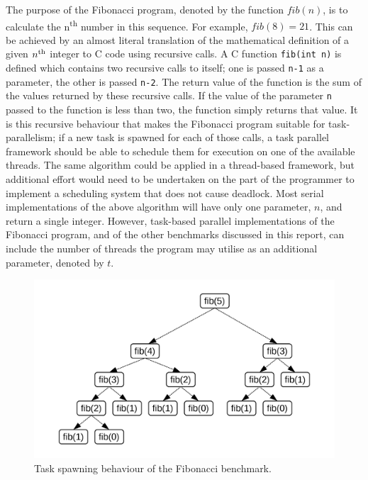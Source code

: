 \documentclass{report}
\begin{document}
The purpose of the Fibonacci program, denoted by the function \(fib(n)\), is to calculate the n\textsuperscript{th} number in this sequence. For example, \(fib(8) = 21\). This can be achieved by an almost literal translation of the mathematical definition of a given \(n\textsuperscript{th}\) integer to C code using recursive calls. A C function \verb!fib(int n)! is defined which contains two recursive calls to itself; one is passed \verb!n-1! as a parameter, the other is passed \verb!n-2!. The return value of the function is the sum of the values returned by these recursive calls. If the value of the parameter \verb!n! passed to the function is less than two, the function simply returns that value. It is this recursive behaviour that makes the Fibonacci program suitable for task-parallelism; if a new task is spawned for each of those calls, a task parallel framework should be able to schedule them for execution on one of the available threads. The same algorithm could be applied in a thread-based framework, but additional effort would need to be undertaken on the part of the programmer to implement a scheduling system that does not cause deadlock. Most serial implementations of the above algorithm will have only one parameter, \(n\), and return a single integer. However, task-based parallel implementations of the Fibonacci program, and of the other benchmarks discussed in this report, can include the number of threads the program may utilise as an additional parameter, denoted by \(t\).
\noindent
\begin{figure}
	\includegraphics[width=\linewidth]{../diagrams/fib_tasks}
	\caption{Task spawning behaviour of the Fibonacci benchmark.}
	\label{Fig:fibtasks}
\end{figure}
\end{document}
